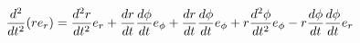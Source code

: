 \documentclass[preview]{standalone}
\begin{document}
\begin{align*}
\frac{d^2}{dt^2} ( r e_r ) = {d^2 r \over dt^2} e_r + {d r \over dt} {d \phi \over dt} e_\phi + {d r \over dt} {d \phi \over dt} e_\phi + r {d^2 \phi \over dt^2} e_\phi - r {d \phi \over dt} {d \phi \over dt} e_{ r}
\end{align*}
\end{document}
